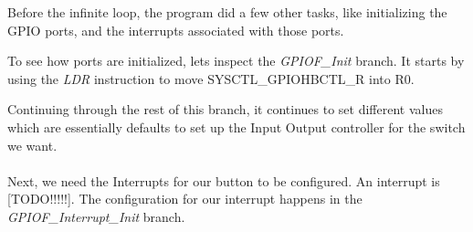 \documentclass[12pt,a4paper]{report}
\begin{document}
Before the infinite loop, the program did a few other tasks, like initializing the GPIO ports, and the interrupts associated with those ports.  

To see how ports are initialized, lets inspect the \textit{GPIOF\_Init} branch. It starts by using the \textit{LDR} instruction to move SYSCTL\_GPIOHBCTL\_R into R0. 

Continuing through the rest of this branch, it continues to set different values which are essentially defaults to set up the Input Output controller for the switch we want.

\paragraph{}
Next, we need the Interrupts for our button to be configured. An interrupt is [TODO!!!!!].
The configuration for our interrupt happens in the \textit{GPIOF\_Interrupt\_Init} branch. 
\end{document}
